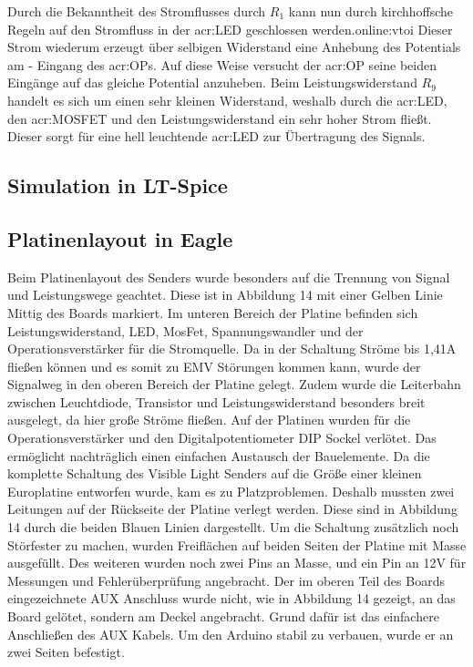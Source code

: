 Durch die Bekanntheit des Stromflusses durch $R_1$ kann nun durch kirchhoffsche Regeln auf den Stromfluss in der \gls{acr:LED} geschlossen werden.\gls{online:vtoi} Dieser Strom wiederum erzeugt über selbigen Widerstand eine Anhebung des Potentials am - Eingang des \gls{acr:OP}s. Auf diese Weise versucht der \gls{acr:OP} seine beiden Eingänge auf das gleiche Potential anzuheben. Beim Leistungswiderstand $R_{9}$ handelt es sich um einen sehr kleinen Widerstand, weshalb durch die \gls{acr:LED}, den \gls{acr:MOSFET} und den Leistungswiderstand ein sehr hoher Strom fließt. Dieser sorgt für eine hell leuchtende \gls{acr:LED} zur Übertragung des Signals.

\subsection{Simulation in LT-Spice}
\label{subsec:Unterabschnitt1}
 
\subsection{Platinenlayout in Eagle}
\label{subsec:Unterabschnitt12}

Beim Platinenlayout des Senders wurde besonders auf die Trennung von Signal und Leistungswege geachtet. Diese ist in Abbildung 14 mit einer Gelben Linie Mittig des Boards markiert.
Im unteren Bereich der Platine befinden sich Leistungswiderstand, LED, MosFet, Spannungswandler und der Operationsverstärker für die Stromquelle. Da in der Schaltung Ströme bis 1,41A fließen können und es somit zu EMV Störungen kommen kann, wurde der Signalweg in den oberen Bereich der Platine gelegt. Zudem
wurde die Leiterbahn zwischen Leuchtdiode, Transistor und Leistungswiderstand besonders breit ausgelegt, da hier große Ströme fließen. Auf der Platinen wurden für die Operationsverstärker und den Digitalpotentiometer
DIP Sockel verlötet. Das ermöglicht nachträglich einen einfachen Austausch der Bauelemente. Da die komplette Schaltung des Visible Light Senders auf die Größe einer kleinen Europlatine entworfen wurde, kam es zu Platzproblemen. Deshalb mussten zwei Leitungen auf der Rückseite der Platine verlegt werden. Diese sind in Abbildung 14 durch die beiden Blauen Linien dargestellt.
Um die Schaltung zusätzlich noch Störfester zu machen, wurden Freiflächen auf beiden Seiten der Platine mit Masse ausgefüllt. Des weiteren wurden noch zwei Pins an Masse, und ein Pin an 12V für Messungen und Fehlerüberprüfung angebracht. Der im oberen Teil des Boards eingezeichnete AUX Anschluss wurde nicht, wie in
Abbildung 14 gezeigt, an das Board gelötet, sondern am Deckel angebracht. Grund dafür ist das einfachere Anschließen des AUX Kabels. Um den Arduino stabil zu verbauen, wurde er an zwei Seiten befestigt.

